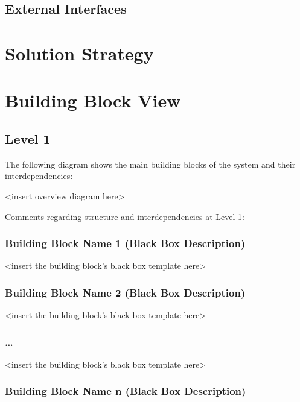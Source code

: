 \documentclass[]{article}
\begin{document}
\subsection{External Interfaces}

\section{Solution Strategy}

\section{Building Block View}

\subsection{Level 1}

The following diagram shows the main building blocks of the system and
their interdependencies:

\textless{}insert overview diagram here\textgreater{}

Comments regarding structure and interdependencies at Level 1:

\subsubsection{Building Block Name 1 (Black Box Description)}

\textless{}insert the building block's black box template
here\textgreater{}

\subsubsection{Building Block Name 2 (Black Box Description)}

\textless{}insert the building block's black box template
here\textgreater{}

\subsubsection{\ldots{}}

\textless{}insert the building block's black box template
here\textgreater{}

\subsubsection{Building Block Name n (Black Box Description)}
\end{document}
